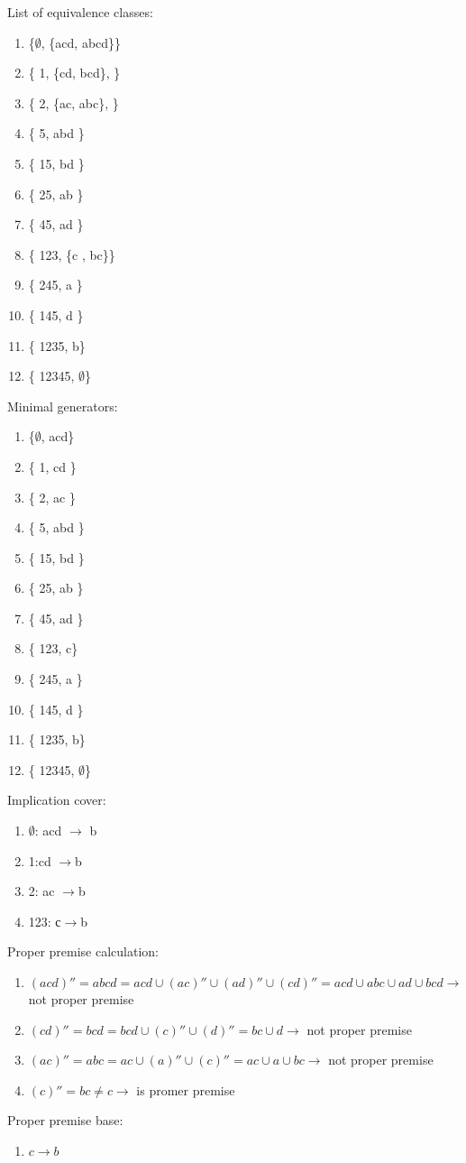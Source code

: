 \begin{minipage}{0.45\textwidth}
List of equivalence classes:
\begin{enumerate}
\item \{$\emptyset$, \{acd, abcd\}\}
\item \{ 1, \{cd, bcd\}, \}
\item \{ 2, \{ac, abc\}, \}
\item \{ 5, abd \}
\item \{ 15, bd \}
\item \{ 25, ab \}
\item \{ 45, ad \}
\item \{ 123, \{c , bc\}\}
\item \{ 245, a \}
\item \{ 145, d \}
\item \{ 1235, b\}
\item \{ 12345, $\emptyset$\}
\end{enumerate}
\end{minipage}
\hfill
\begin{minipage}{0.45\textwidth}
Minimal generators:
\begin{enumerate}
\item \{$\emptyset$, acd\}
\item \{ 1, cd \}
\item \{ 2, ac \}
\item \{ 5, abd \}
\item \{ 15, bd \}
\item \{ 25, ab \}
\item \{ 45, ad \}
\item \{ 123, c\}
\item \{ 245, a \}
\item \{ 145, d \}
\item \{ 1235, b\}
\item \{ 12345, $\emptyset$\}
\end{enumerate}
\end{minipage}

Implication cover:
\begin{enumerate}
\item $\emptyset$: acd $\rightarrow$ b
\item 1:cd $\rightarrow$b
\item 2: ac $\rightarrow $b
\item 123: с$\rightarrow$b
\end{enumerate}

Proper premise calculation:
\begin{enumerate}
\item $(acd)'' = abcd = acd \cup (ac)'' \cup (ad)'' \cup (cd)'' = acd \cup abc \cup ad \cup bcd \rightarrow$ not proper premise
\item $(cd)'' = bcd = bcd \cup (c)'' \cup (d)'' = bc \cup d \rightarrow $ not proper premise
\item $(ac)'' = abc = ac \cup (a)'' \cup (c)'' = ac \cup a \cup bc \rightarrow $ not proper premise
\item $(c)'' = bc \neq c \rightarrow $ is promer premise
\end{enumerate}

Proper premise base:
\begin{enumerate}
\item $c \rightarrow b$
\end{enumerate}
